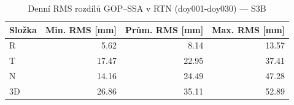 \begin{table}[H]
\centering
\caption{Denní RMS rozdílů GOP–SSA v RTN (doy001-doy030) — S3B}
\label{tab:gop_vs_ssa_s3b_doy001-doy030_rms}
\begin{tabular}{lrrr}
\toprule
Složka & Min. RMS [mm] & Prům. RMS [mm] & Max. RMS [mm] \\
\midrule
R & 5.62 & 8.14 & 13.57 \\
T & 17.47 & 22.95 & 37.41 \\
N & 14.16 & 24.49 & 47.28 \\
3D & 26.86 & 35.11 & 52.89 \\
\bottomrule
\end{tabular}
\end{table}

